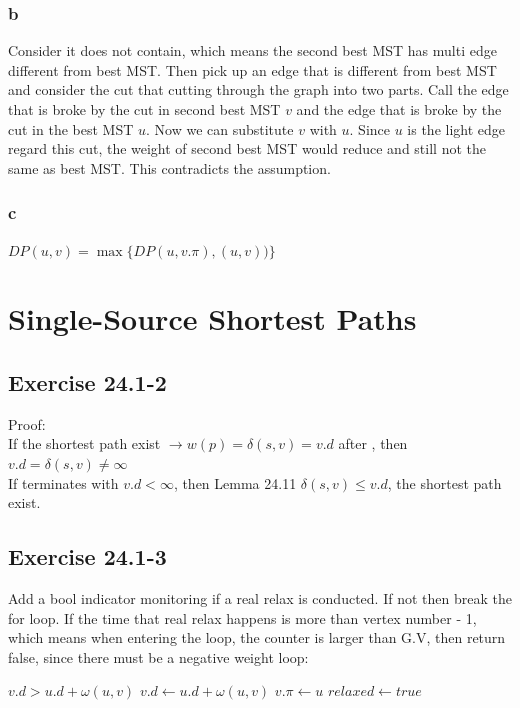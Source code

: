 \documentclass[]{article}
\begin{document}
\subsubsection{b}
Consider it does not contain, which means the second best MST has multi edge different from best MST. Then pick up an edge that is different from best MST and consider the cut that cutting through the graph into two parts. Call the edge that is broke by the cut in second best MST $v$ and the edge that is broke by the cut in the best MST $u$. Now we can substitute $v$ with $u$. Since $u$ is the light edge regard this cut, the weight of second best MST would reduce and still not the same as best MST. This contradicts the assumption.
   
\subsubsection{c}
$DP(u,v) = \max \{DP(u, v.\pi), (u,v))\}$
\section{Single-Source Shortest Paths}

\subsection{Exercise 24.1-2}
Proof:\\
If the shortest path exist $\rightarrow w(p) = \delta(s,v) = v.d$ after , then $v.d = \delta(s,v) \neq \infty$\\
If  terminates with $v.d < \infty$, then Lemma 24.11 $\delta(s, v) \le v.d$, the shortest path exist.

\subsection{Exercise 24.1-3}

Add a bool indicator monitoring if a real relax is conducted. If not then break the for loop. If the time that real relax happens is more than vertex number - 1, which means when entering the loop, the counter is larger than G.V, then return false, since there must be a negative weight loop:

\begin{codebox}
	\li \If $v.d > u.d + \omega(u,v)$
	\li \Then $v.d \leftarrow u.d + \omega(u,v)$
	\li $v.\pi \leftarrow u$
	\li $relaxed \leftarrow true$
\end{codebox}
\end{document}
